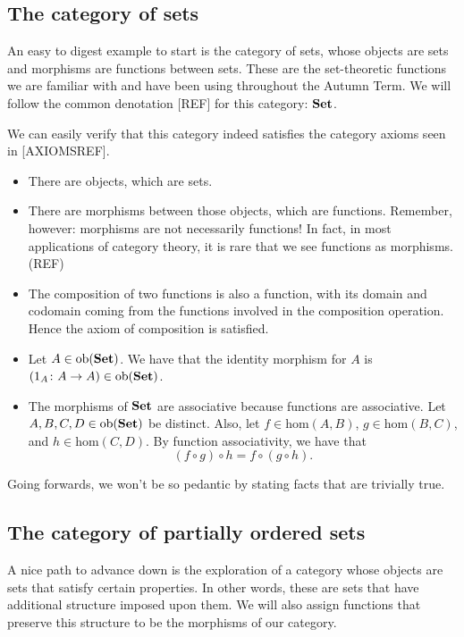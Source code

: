 \documentclass[10pt,a4paper,reqno]{amsart}
\numberwithin{figure}{section}
\begin{document}
\subsection{The category of sets}
An easy to digest example to start is the category of sets, whose objects are sets and
morphisms are functions between sets. These are the set-theoretic functions we
are familiar with and have been using throughout the Autumn Term. We will follow
the common denotation [REF] for this category: $\operatorname{\mathbf{Set}}$.

We can easily verify that this category indeed satisfies the category axioms
seen in [AXIOMSREF].
\begin{itemize}
        \item There are objects, which are sets.
        \item There are morphisms between those objects, which are functions.
                Remember, however: morphisms are not necessarily functions! In fact,
                in most applications of category theory, it is rare that we see
                functions as morphisms. (REF)
        \item The composition of two functions is also a function, with its
                domain and codomain coming from the functions involved in the
                composition operation. Hence the axiom of composition is
                satisfied.
        \item Let $A \in \mathrm{ob} ( \operatorname{\mathbf{Set}} )$. We have that the identity
                morphism for $A$ is $(1_A \colon A \to A) \in \mathrm{ob} ( \operatorname{\mathbf{Set}} )$.
        \item The morphisms of $\operatorname{\mathbf{Set}}$ are associative because functions are
                associative. Let $A,B,C,D \in \mathrm{ob} ( \operatorname{\mathbf{Set}} )$ be distinct. Also, let
                $f \in \mathrm{hom} (A, B)$, $g \in \mathrm{hom} (B, C)$, and $h \in
                \mathrm{hom} (C, D)$. By function associativity, we have that
                \begin{equation*}
                        ( f \circ g ) \circ h = f \circ ( g \circ h ).
                \end{equation*}
\end{itemize}
Going forwards, we won't be so pedantic by stating facts that are trivially
true.

\subsection{The category of partially ordered sets}
A nice path to advance down is the exploration of a category whose objects are
sets that satisfy certain properties. In other words, these are sets that have
additional structure imposed upon them. We will also assign functions that
preserve this structure to be the morphisms of our category.
\end{document}
